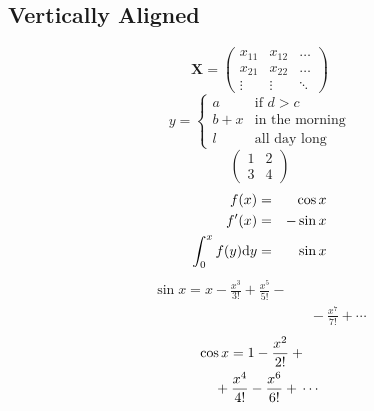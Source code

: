 \documentclass[a4paper,11pt]{article}
\begin{document}
\subsection{Vertically Aligned}
\begin{displaymath}
    \mathbf{X} =
    \left(
        \begin{array}{ccc}
            x_{11} & x_{12} & \ldots \\
            x_{21} & x_{22} & \ldots \\
            \vdots & \vdots & \ddots
        \end{array}
    \right)
\end{displaymath}
\begin{displaymath}
    y = \left\{
        \begin{array}{ll}
            a   &   \textrm{if $d > c$}\\
            b+x &   \textrm{in the morning} \\
            l   &   \textrm{all day long}
        \end{array}
        \right.
\end{displaymath}
\begin{displaymath}
    \left(
        \begin{array}{c|c}
            1 & 2 \\
            \hline
            3 & 4
        \end{array}
    \right)
\end{displaymath}
\begin{eqnarray}
    f(x)    &=& \cos x \\
    f'(x)   &=& -\sin x\\
    \int_{0}^{x} f(y)\mathrm{d} y &=& \sin x
\end{eqnarray}
{\setlength\arraycolsep{2pt}
\begin{eqnarray}
    \sin x = x - \frac{x^3}{3!} + \frac{x^5}{5!}-{}
    \nonumber \\
    & & {}-\frac{x^7}{7!}+{}\cdots
\end{eqnarray}
}
\begin{eqnarray}
    \lefteqn{
        \cos x =1-\frac{x^2}{2!}+{}}
        \nonumber\\
        & &{}+\frac{x^4}{4!}-\frac{x^6}{6!}+{}\cdots
\end{eqnarray}
\end{document}
